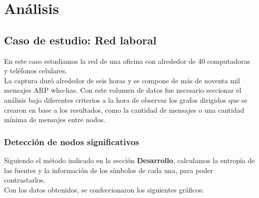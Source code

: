 \section{Análisis}

\subsection{Caso de estudio: Red laboral}

\indent \indent En este caso estudiamos la red de una oficina con alrededor de 40 computadoras y teléfonos celulares.\\
\indent La captura duró alrededor de seis horas y se compone de más de noventa mil mensajes ARP who-has. Con este volumen de datos fue necesario seccionar el análisis bajo diferentes criterios a la hora de observar los grafos dirigidos que se crearon en base a los resultados, como la cantidad de mensajes o una cantidad mínima de mensajes entre nodos.\\

\subsubsection{Detección de nodos significativos}


\indent \indent Siguiendo el método indicado en la sección \textbf{Desarrollo}, calculamos la entropía de las fuentes y la información de los símbolos de cada una, para poder contrastarlos.\\
\indent Con los datos obtenidos, se confeccionaron los siguientes gráficos:\\

